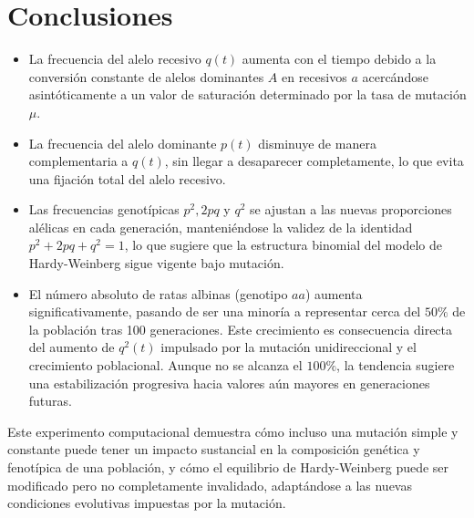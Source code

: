 \documentclass[12pt]{article}
\begin{document}
\section{Conclusiones}
\begin{itemize}
    \item La frecuencia del alelo recesivo $q(t)$ aumenta con el tiempo debido a la conversión constante de alelos dominantes $A$ en recesivos $a$ acercándose  asintóticamente a un valor de saturación determinado por la tasa de mutación $\mu$.
    \item La frecuencia del alelo dominante $p(t)$ disminuye de manera complementaria a $q(t)$, sin llegar a desaparecer completamente, lo que evita una fijación total del alelo recesivo.
    \item Las frecuencias genotípicas $p^{2},2pq$ y $q^{2}$ se ajustan a las nuevas proporciones alélicas en cada generación, manteniéndose la validez de la identidad $p^2+2pq+q^2=1$, lo que sugiere que la estructura binomial del modelo de Hardy-Weinberg sigue vigente bajo mutación.
    \item El número absoluto de ratas albinas (genotipo $aa$)  aumenta significativamente, pasando de ser una minoría a representar cerca del $50\%$ de la población tras 100 generaciones. Este crecimiento es consecuencia directa del aumento de $q^2(t)$ impulsado por la mutación unidireccional y el crecimiento poblacional. Aunque no se alcanza el $100\%$, la tendencia sugiere una estabilización progresiva hacia valores aún mayores en generaciones futuras.
    \end{itemize}
Este experimento computacional demuestra cómo incluso una mutación simple y constante puede tener un impacto sustancial en la composición genética y fenotípica de una población, y cómo el equilibrio de Hardy-Weinberg puede ser modificado pero no completamente invalidado, adaptándose a las nuevas condiciones evolutivas impuestas por la mutación.\\
\end{document}
